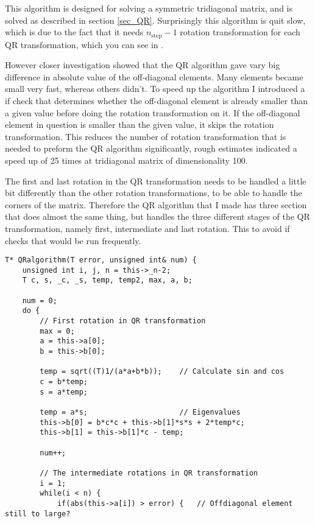 \documentclass[11pt,english,a4paper]{article}
\begin{document}
\begin{flushleft}
This algorithm is designed for solving a symmetric tridiagonal matrix, and is solved as described in section \ref{sec_QR}. Surprisingly this algorithm is quit slow, which is due to the fact that it needs $n_{\text{step}}-1$ rotation transformation for each QR transformation, which you can see in . \linebreak

However closer investigation showed that the QR algorithm gave vary big difference in absolute value of the off-diagonal elements. Many elements became small very fast, whereas others didn't. To speed up the algorithm I introduced a if check that determines whether the off-diagonal element is already smaller than a given value before doing the rotation transformation on it. If the off-diagonal element in question is smaller than the given value, it skips the rotation transformation. This reduces the number of rotation transformation that is needed to preform the QR algorithm significantly, rough estimates indicated a speed up of 25 times at tridiagonal matrix of dimensionality 100. \linebreak

The first and last rotation in the QR transformation needs to be handled a little bit differently than the other rotation transformations, to be able to handle the corners of the matrix. Therefore the QR algorithm that I made has three section that does almost the same thing, but handles the three different stages of the QR transformation, namely first, intermediate and last rotation. This to avoid if checks that would be run frequently.

\begin{lstlisting}[title={\texttt{Matrix<MatrixType::TridiagonalSymmetric, T>::QRalgorithm}}]
T* QRalgorithm(T error, unsigned int& num) {
	unsigned int i, j, n = this->_n-2;
	T c, s, _c, _s, temp, temp2, max, a, b;

	num = 0;
	do {
		// First rotation in QR transformation
		max = 0;
		a = this->a[0];
		b = this->b[0];

		temp = sqrt((T)1/(a*a+b*b));	// Calculate sin and cos
		c = b*temp;
		s = a*temp;
		
		temp = a*s;                  	// Eigenvalues
		this->b[0] = b*c*c + this->b[1]*s*s + 2*temp*c;
		this->b[1] = this->b[1]*c - temp;
		
		num++;
		
		// The intermediate rotations in QR transformation
		i = 1;
		while(i < n) {
			if(abs(this->a[i]) > error) {	// Offdiagonal element still to large?


\end{lstlisting}
\end{flushleft}
\end{document}
